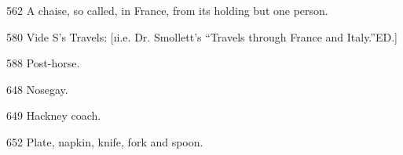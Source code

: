 \documentclass[twoside]{article}
\begin{document}


{562}  A chaise, so called, in France, from its holding but one person.

{580}  Vide S\tsk ’s Travels: [\i{i.e.} Dr. Smollett’s “Travels through France
and Italy.”\tsk ED.]

{588}  Post-horse.

{648}  Nosegay.

{649}  Hackney coach.

{652}  Plate, napkin, knife, fork and spoon.
\end{document}

